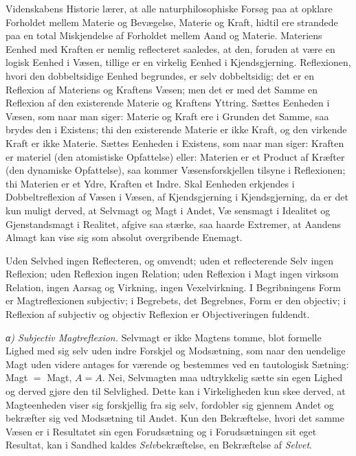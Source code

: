 \documentclass[12pt,a4paper]{book}
\newcommand{\subrunin}[1]{\emph{#1}\hspace{0.4em}}
\begin{document}
Videnskabens Historie lærer, at alle naturphilosophiske Forsøg paa at
opklare Forholdet mellem Materie og Bevægelse, Materie og Kraft, hidtil
ere strandede paa en total Miskjendelse af Forholdet mellem Aand og
Materie. Materiens Eenhed med Kraften er nemlig reflecteret saaledes,
at den, foruden at være en logisk Eenhed i Væsen, tillige er en virkelig
Eenhed i Kjendsgjerning. Reflexionen, hvori den dobbeltsidige Eenhed
begrundes, er selv dobbeltsidig; det er en Reflexion af Materiens og
Kraftens Væsen; men det er med det Samme en Reflexion af den existerende
Materie og Kraftens Yttring. Sættes Eenheden i Væsen, som naar man
siger: Materie og Kraft ere i Grunden det Samme, saa brydes den i
Existens; thi den existerende Materie er ikke Kraft, og den virkende
Kraft er ikke Materie. Sættes Eenheden i Existens, som naar man siger:
Kraften er materiel (den atomistiske Opfattelse) eller: Materien er et
Product af Kræfter (den dynamiske Opfattelse), saa kommer
Væsensforskjellen tilsyne i Reflexionen; thi Materien er et Ydre,
Kraften et Indre. Skal Eenheden erkjendes i Dobbeltreflexion af Væsen i
Væsen, af Kjendsgjerning i Kjendsgjerning, da er det kun muligt derved,
at Selvmagt og Magt i Andet, Væ\-%
sensmagt i Idealitet og Gjenstandsmagt i Realitet, afgive saa stærke,
saa haarde Extremer, at Aandens Almagt kan vise sig som absolut
overgribende Enemagt.

Uden Selvhed ingen Reflecteren, og omvendt; uden et reflecterende Selv
ingen Reflexion; uden Reflexion ingen Relation; uden Reflexion i Magt
ingen virksom Relation, ingen Aarsag og Virkning, ingen Vexelvirkning.
I Begribningens Form er Magtreflexionen subjectiv; i Begrebets, det
Begrebnes, Form er den objectiv; i Reflexion af subjectiv og objectiv
Reflexion er Objectiveringen fuldendt.

\subrunin{α) Subjectiv Magtreflexion.} Selvmagt er ikke Magtens tomme,
blot formelle Lighed med sig selv uden indre Forskjel og Modsætning, som
naar den uendelige Magt uden videre antages for værende og bestemmes ved
en tautologisk Sætning: Magt $=$ Magt, $A = A$. Nei, Selvmagten maa
udtrykkelig sætte sin egen Lighed og derved gjøre den til Selvlighed.
Dette kan i Virkeligheden kun skee derved, at Magteenheden viser sig
forskjellig fra sig selv, fordobler sig gjennem Andet og bekræfter sig
ved Modsætning til Andet. Kun den Bekræftelse, hvori det samme Væsen er
i Resultatet sin egen Forudsætning og i Forudsætningen sit eget
Resultat, kan i Sandhed kaldes \emph{Selv}bekræftelse, en Bekræftelse af
\emph{Selvet}.
\end{document}
